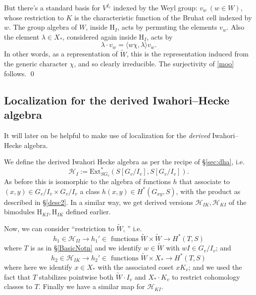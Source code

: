 \documentclass[10pt]{amsart}
\newcommand{\Ext}{\mathrm{Ext}}
\theoremstyle{remark}
\begin{document}
But there's a standard basis for $V^{I_v}$ indexed by the Weyl group:  $v_w \ (w \in W)$, whose restriction to $K$ 
is the characteristic function of the Bruhat cell  indexed by $w$. 
 The group algebra of $W$, inside $\mathrm{H}_I$, acts by permuting the elements $v_w$. 
Also the element $\lambda \in X_* $, considered again inside $\mathrm{H}_I$, acts by  \begin{equation} \label{explicit00}  \lambda \cdot v_w = \langle w \chi, \lambda \rangle v_w.\end{equation}
In other words, as a representation of $\tilde{W}$, this is the representation
induced from the generic character $\chi$, and so clearly irreducible.  The surjectivity of \eqref{moo} follows. 
 \qed	
 

  
 \subsection{Localization for the derived Iwahori--Hecke algebra} \label{dhLocalization}
It will later on be helpful to make use of localization for the {\em derived} Iwahori--Hecke algebra.  

We define the derived Iwahori Hecke algebra as per the recipe of \S \ref{sec:dha}, i.e.
$$ \mathscr{H}_I := \Ext_{SG_v}^*(S[G_v/I_v], S[G_v/I_v]).$$
As before this  is isomorphic to the algebra of functions  $h$ that associate to $(x,y) \in G_v/I_v \times G_v/I_v$
a class $h(x,y) \in H^*(G_{xy}, S)$, with the product as described in \S \ref{desc2}.
  In a similar way, we get derived versions
$\mathscr{H}_{IK},\mathscr{H}_{KI}$ of the bimodules $\mathrm{H}_{KI}, \mathrm{H}_{IK}$ defined earlier. 


 Now, we can consider  ``restriction to $\tilde{W}$, '' i.e.
\begin{equation} \label{Tau1}  h_1  \in \mathscr{H}_{II} \longrightarrow  h_1' \in  \mbox{ functions $\tilde{W} \times \tilde{W} \rightarrow H^*(T,S)$} \end{equation}
where $T$ is as in 
\S \ref{BasicNotn}
 and we identify $w \in \tilde{W}$ with $wI \in G_v/I_v$; and 
\begin{equation} \label{Tau2}  h_2 \in \mathscr{H}_{IK} \longrightarrow  h_2' \in \mbox{ functions $\tilde{W} \times X_* \rightarrow H^*(T,S)$} \end{equation} where here we identify $x \in X_*$ with the associated coset $xK_v$; and we used the fact that $T$ stabilizes pointwise both  $\tilde{W} \cdot I_v$ and $X_* \cdot K_v$ to restrict cohomology classes to $T$. 
 Finally we have a similar map for $\mathscr{H}_{KI}$.
 
\end{document}
